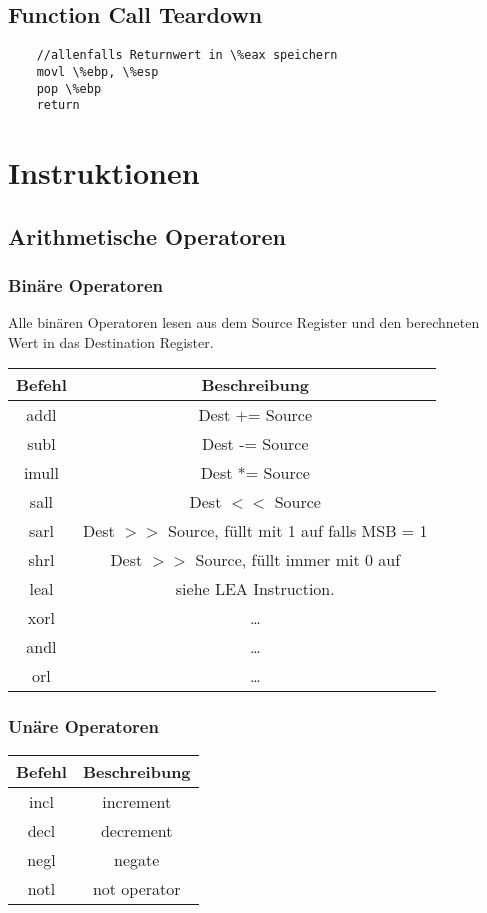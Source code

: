 \documentclass[a4paper, 11pt]{article}
\begin{document}
\subsection{Function Call Teardown}
\begin{lstlisting}
	//allenfalls Returnwert in \%eax speichern
	movl \%ebp, \%esp
	pop \%ebp
	return
\end{lstlisting}

\section{Instruktionen}
\subsection{Arithmetische Operatoren}

\subsubsection{Binäre Operatoren}
Alle binären Operatoren lesen aus dem Source Register und den berechneten Wert in das Destination Register.

\begin{tabular}{|c|c|}
	\hline
	Befehl & Beschreibung\\\hline\hline
	addl & Dest += Source\\\hline
	subl & Dest -= Source \\\hline
	imull & Dest *= Source \\\hline
	sall & Dest $<<$ Source\\\hline
	sarl & Dest $>>$ Source, füllt mit 1 auf falls MSB = 1 \\\hline
	shrl & Dest $>>$ Source, füllt immer mit 0 auf\\\hline
	leal & siehe LEA Instruction. \\\hline
	xorl & \ldots \\\hline
	andl &\ldots  \\\hline
	orl & \ldots \\\hline
\end{tabular}

\subsubsection{Unäre Operatoren}
\begin{tabular}{|c|c|}
	\hline
	Befehl & Beschreibung\\\hline\hline
	incl & increment \\\hline
	decl & decrement \\\hline
	negl & negate \\\hline
	notl & not operator\\\hline
\end{tabular}
\end{document}
